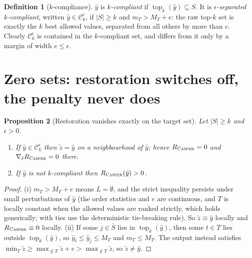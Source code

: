 \documentclass[11pt]{article}
\providecommand{\casper}{\textnormal{\textsc{Casper}}}
\DeclareMathOperator{\Topk}{top}\renewcommand{\Topk}{\operatorname{top}_k}
\newcommand{\yh}{\hat y}
\newcommand{\zt}{\tilde z}
\newcommand{\Sb}{\bar S}
\newcommand{\1}{\mathbf 1}
\newcommand{\Ck}{\mathcal C_k^{\epsilon}}
\newcommand{\Rc}{R_{\casper}}
\newtheorem{proposition}{Proposition}
\theoremstyle{definition}
\newtheorem{definition}[proposition]{Definition}
\theoremstyle{remark}
\begin{document}
\begin{definition}[$k$-compliance]
$\yh$ is \emph{$k$-compliant} if $\Topk(\yh)\subseteq S$. It is \emph{$\epsilon$-separated
$k$-compliant}, written $\yh\in\Ck$, if $|S|\ge k$ and $m_T>M_T+e$: the raw top-$k$ set is exactly
the $k$ best allowed values, separated from all others by more than $e$. Clearly $\Ck$ is contained
in the $k$-compliant set, and differs from it only by a margin of width $e\le\epsilon$.
\end{definition}

\section{Zero sets: restoration switches off, the penalty never does}

\begin{proposition}[Restoration vanishes exactly on the target set]\label{prop:zero}
Let $|S|\ge k$ and $\epsilon>0$.
\begin{enumerate}
\item[(i)] If $\yh\in\Ck$ then $\zt=\yh$ on a neighbourhood of $\yh$; hence $\Rc=0$ and
$\nabla_\ell\Rc=0$ there.
\item[(ii)] If $\yh$ is not $k$-compliant then $\Rc(\yh)>0$.
\end{enumerate}
\end{proposition}
\begin{proof}
(i) $m_T>M_T+e$ means $L=\emptyset$, and the strict inequality persists under small perturbations
of $\yh$ (the order statistics and $e$ are continuous, and $T$ is locally constant when the
allowed values are ranked strictly, which holds generically; with ties use the deterministic
tie-breaking rule). So $\zt\equiv\yh$ locally and $\Rc\equiv0$ locally.
(ii) If some $j\in\Sb$ lies in $\Topk(\yh)$, then some $t\in T$ lies outside $\Topk(\yh)$, so
$\yh_t\le\yh_j\le M_T$ and $m_T\le M_T$. The output instead satisfies
$\min_T\zt\ge\max_{\notin T}\zt+e>\max_{\notin T}\zt$, so $\zt\neq\yh$.
\end{proof}
\end{document}

